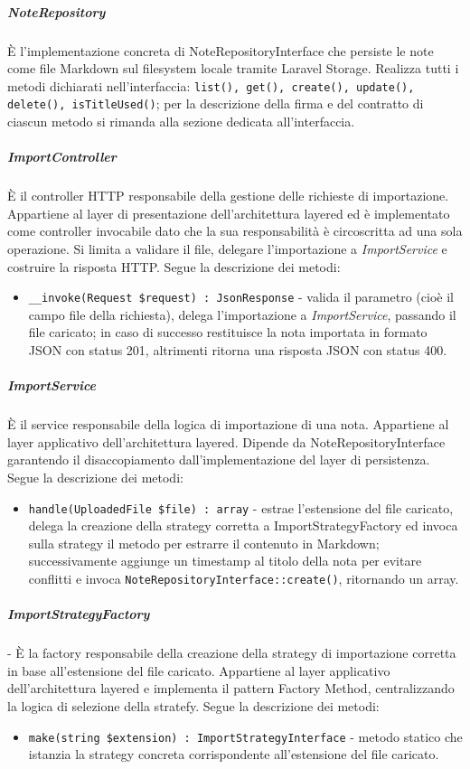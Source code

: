 \documentclass[a4paper,10pt]{article}
\begin{document}
\subparagraph{NoteRepository} È l'implementazione concreta di NoteRepositoryInterface che persiste le note come file Markdown sul filesystem locale tramite Laravel Storage. Realizza tutti i metodi dichiarati nell'interfaccia: \texttt{list(), get(), create(), update(), delete(), isTitleUsed()}; per la descrizione della firma e del contratto di ciascun metodo si rimanda alla sezione dedicata all'interfaccia.
\subparagraph{ImportController} È il controller HTTP responsabile della gestione delle richieste di importazione. Appartiene al layer di presentazione dell'architettura layered ed è implementato come controller invocabile dato che la sua responsabilità è circoscritta ad una sola operazione. Si limita a validare il file, delegare l'importazione a \textit{ImportService} e costruire la risposta HTTP. Segue la descrizione dei metodi:
\begin{itemize}
    \item \texttt{\_\_invoke(Request \$request) : JsonResponse} - valida il parametro (cioè il campo file della richiesta), delega l'importazione a \textit{ImportService}, passando il file caricato; in caso di successo restituisce la nota importata in formato JSON con status 201, altrimenti ritorna una risposta JSON con status 400.
\end{itemize}
\subparagraph{ImportService} È il service responsabile della logica di importazione di una nota. Appartiene al layer applicativo dell'architettura layered. Dipende da NoteRepositoryInterface garantendo il disaccopiamento dall'implementazione del layer di persistenza. Segue la descrizione dei metodi:
\begin{itemize}
    \item \texttt{handle(UploadedFile \$file) : array} - estrae l'estensione del file caricato, delega la creazione della strategy corretta a ImportStrategyFactory ed invoca sulla strategy il metodo per estrarre il contenuto in Markdown; successivamente aggiunge un timestamp al titolo della nota per evitare conflitti e invoca \texttt{NoteRepositoryInterface::create()}, ritornando un array.
\end{itemize}
\subparagraph{ImportStrategyFactory} - È la factory responsabile della creazione della strategy di importazione corretta in base all'estensione del file caricato. Appartiene al layer applicativo dell'architettura layered e implementa il pattern Factory Method, centralizzando la logica di selezione della stratefy. Segue la descrizione dei metodi:
\begin{itemize}
    \item \texttt{make(string \$extension) : ImportStrategyInterface} - metodo statico che istanzia la strategy concreta corrispondente all'estensione del file caricato.
\end{itemize} 
\end{document}
